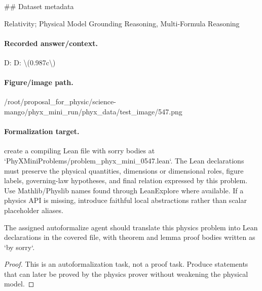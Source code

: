 \#\# Dataset metadata

Relativity; Physical Model Grounding Reasoning, Multi-Formula Reasoning

\paragraph{Recorded answer/context.}
D: D: \textbackslash{}(0.987c\textbackslash{})

\paragraph{Figure/image path.}
/root/proposal\_for\_physic/science-mango/phyx\_mini\_run/phyx\_data/test\_image/547.png

\paragraph{Formalization target.}
create a compiling Lean file with sorry bodies at `PhyXMiniProblems/problem\_phyx\_mini\_0547.lean`. The Lean declarations must preserve the physical quantities, dimensions or dimensional roles, figure labels, governing-law hypotheses, and final relation expressed by this problem.
Use Mathlib/Physlib names found through LeanExplore where available. If a physics API is missing, introduce faithful local abstractions rather than scalar placeholder aliases.

\begin{theorem}
\label{thm:physics:phyx_mini_0547:target}
The assigned autoformalize agent should translate this physics problem into Lean declarations in the covered file, with theorem and lemma proof bodies written as `by sorry`.
\end{theorem}
\begin{proof}
This is an autoformalization task, not a proof task. Produce statements that can later be proved by the physics prover without weakening the physical model.
\end{proof}

